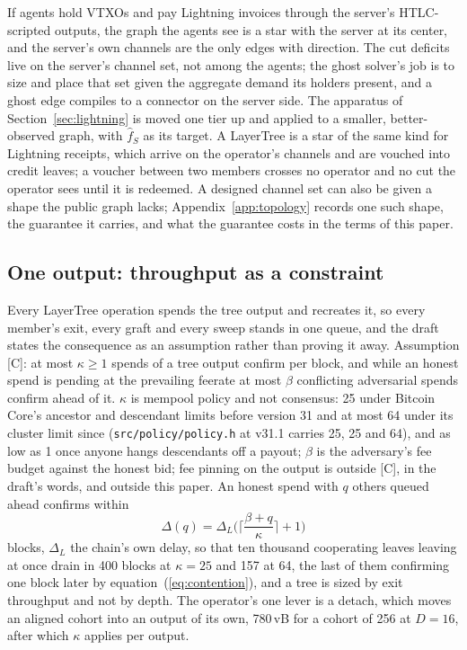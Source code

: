 \documentclass[11pt]{article}
\theoremstyle{plain}
\theoremstyle{definition}
\theoremstyle{remark}
\begin{document}
If agents hold VTXOs and pay Lightning invoices through the server's HTLC-scripted outputs, the graph the agents see is a star with the server at its center, and the server's own channels are the only edges with direction. The cut deficits live on the server's channel set, not among the agents; the ghost solver's job is to size and place that set given the aggregate demand its holders present, and a ghost edge compiles to a connector on the server side. The apparatus of Section~\ref{sec:lightning} is moved one tier up and applied to a smaller, better-observed graph, with $\hat f_S$ as its target. A LayerTree is a star of the same kind for Lightning receipts, which arrive on the operator's channels and are vouched into credit leaves; a voucher between two members crosses no operator and no cut the operator sees until it is redeemed. A designed channel set can also be given a shape the public graph lacks; Appendix~\ref{app:topology} records one such shape, the guarantee it carries, and what the guarantee costs in the terms of this paper.

\subsection{One output: throughput as a constraint}
\label{sec:throughput}

Every LayerTree operation spends the tree output and recreates it, so every member's exit, every graft and every sweep stands in one queue, and the draft states the consequence as an assumption rather than proving it away. Assumption [C]: at most $\kappa\ge 1$ spends of a tree output confirm per block, and while an honest spend is pending at the prevailing feerate at most $\beta$ conflicting adversarial spends confirm ahead of it. $\kappa$ is mempool policy and not consensus: 25 under Bitcoin Core's ancestor and descendant limits before version 31 and at most 64 under its cluster limit since (\texttt{src/policy/policy.h} at v31.1 carries 25, 25 and 64), and as low as 1 once anyone hangs descendants off a payout; $\beta$ is the adversary's fee budget against the honest bid; fee pinning on the output is outside [C], in the draft's words, and outside this paper. An honest spend with $q$ others queued ahead confirms within
\begin{equation}
\Delta(q)=\Delta_L\Big(\Big\lceil\frac{\beta+q}{\kappa}\Big\rceil+1\Big)
\label{eq:contention}
\end{equation}
blocks, $\Delta_L$ the chain's own delay, so that ten thousand cooperating leaves leaving at once drain in 400 blocks at $\kappa=25$ and 157 at 64, the last of them confirming one block later by equation~(\ref{eq:contention}), and a tree is sized by exit throughput and not by depth. The operator's one lever is a detach, which moves an aligned cohort into an output of its own, 780\,vB for a cohort of 256 at $D=16$, after which $\kappa$ applies per output.
\end{document}
